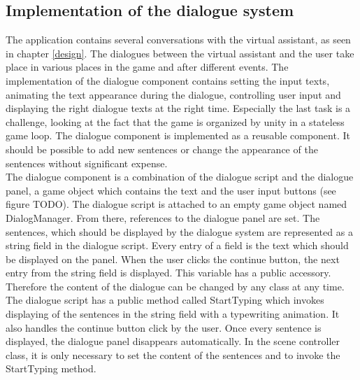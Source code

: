 \subsection{Implementation of the dialogue system}
The application contains several conversations with the virtual assistant, as seen in chapter \ref{design}. The dialogues between the virtual assistant and the user take place in various places in the game and after different events. The implementation of the dialogue component contains setting the input texts, animating the text appearance during the dialogue, controlling user input and displaying the right dialogue texts at the right time. Especially the last task is a challenge, looking at the fact that the game is organized by unity in a stateless game loop. The dialogue component is implemented as a reusable component. It should be possible to add new sentences or change the appearance of the sentences without significant expense.\\
The dialogue component is a combination of the dialogue script and the dialogue panel, a game object which contains the text and the user input buttons (see figure TODO). The dialogue script is attached to an empty game object named DialogManager. From there, references to the dialogue panel are set. The sentences, which should be displayed by the dialogue system are represented as a string field in the dialogue script. Every entry of a field is the text which should be displayed on the panel. When the user clicks the continue button, the next entry from the string field is displayed. This variable has a public accessory. Therefore the content of the dialogue can be changed by any class at any time. \\
The dialogue script has a public method called StartTyping which invokes displaying of the sentences in the string field with a typewriting animation. It also handles the continue button click by the user. Once every sentence is displayed, the dialogue panel disappears automatically. In the scene controller class, it is only necessary to set the content of the sentences and to invoke the StartTyping method. \\
